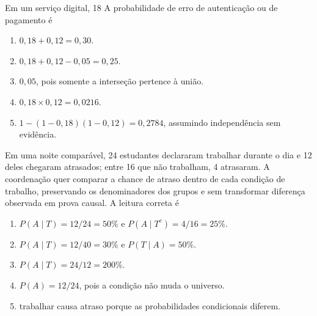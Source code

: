 \TextoBase Em um serviço digital, 18%
\FonteDidatica
\Comando A probabilidade de erro de autenticação ou de pagamento é
\begin{enumerate}[label=\Alph*)]
\item $0{,}18+0{,}12=0{,}30$.
\item $0{,}18+0{,}12-0{,}05=0{,}25$.
\item $0{,}05$, pois somente a interseção pertence à união.
\item $0{,}18\times0{,}12=0{,}0216$.
\item $1-(1-0{,}18)(1-0{,}12)=0{,}2784$, assumindo independência sem evidência.
\end{enumerate}
\TextoBase Em uma noite comparável, 24 estudantes declararam trabalhar durante o dia e 12 deles chegaram atrasados; entre 16 que não trabalham, 4 atrasaram. A coordenação quer comparar a chance de atraso dentro de cada condição de trabalho, preservando os denominadores dos grupos e sem transformar diferença observada em prova causal.
\FonteDidatica
\Comando A leitura correta é
\begin{enumerate}[label=\Alph*)]\item $P(A\mid T)=12/24=50\%$ e $P(A\mid T^c)=4/16=25\%$.\item $P(A\mid T)=12/40=30\%$ e $P(T\mid A)=50\%$.\item $P(A\mid T)=24/12=200\%$.\item $P(A)=12/24$, pois a condição não muda o universo.\item trabalhar causa atraso porque as probabilidades condicionais diferem.\end{enumerate}

